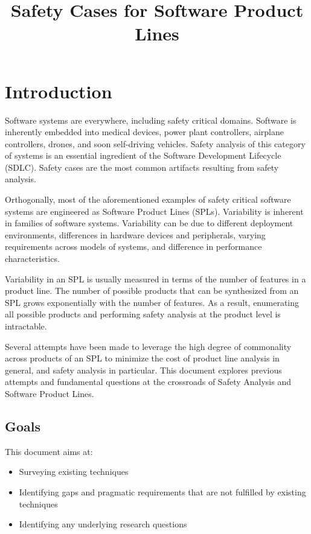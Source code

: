 \documentclass[11pt]{article}
\title{Safety Cases for Software Product Lines}
\date{}                                           %
\begin{document}
\maketitle


\section{Introduction}
Software systems are everywhere, including safety critical domains. Software is inherently embedded into medical devices, power plant controllers, airplane controllers, drones, and soon self-driving vehicles. Safety analysis of this category of systems is an essential ingredient of the Software Development Lifecycle (SDLC). Safety cases are the most common artifacts resulting from safety analysis.

Orthogonally, most of the aforementioned examples of safety critical software systems are engineered as Software Product Lines (SPLs). Variability is inherent in families of software systems. Variability can be due to different deployment environments, differences in hardware devices and peripherals, varying requirements across models of systems, and difference in performance characteristics.

Variability in an SPL is usually measured in terms of the number of features in a product line. The number of possible products that can be synthesized from an SPL grows exponentially with the number of features. As a result, enumerating all possible products and performing safety analysis at the product level is intractable. 

Several attempts have been made to leverage the high degree of commonality across products of an SPL to minimize the cost of product line analysis in general, and safety analysis in particular. This document explores previous attempts and fundamental questions at the crossroads of Safety Analysis and Software Product Lines.

\subsection{Goals}
This document aims at:
\begin{itemize}
\item Surveying existing techniques
\item Identifying gaps and pragmatic requirements that are not fulfilled by existing techniques
\item Identifying any underlying research questions
\end{itemize}
\end{document}
